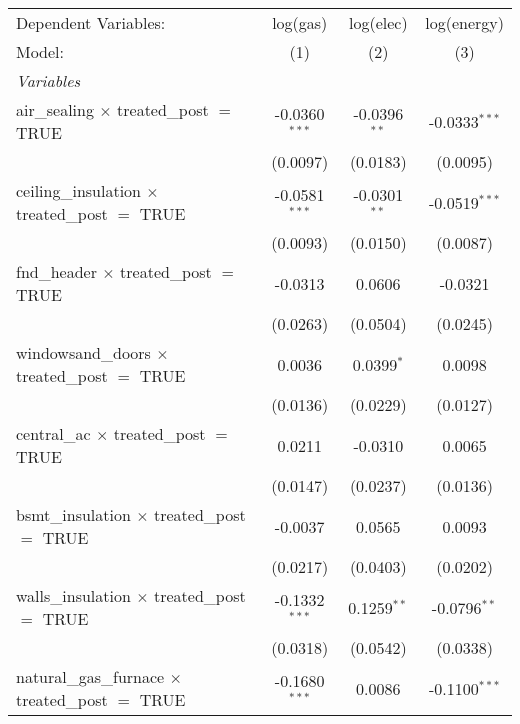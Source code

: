 \begin{tabular}{lccc}
   \tabularnewline\midrule\midrule
   Dependent Variables:                                      & log(gas)        & log(elec)      & log(energy)\\
   Model:                                                    & (1)             & (2)            & (3)\\
   \midrule \emph{Variables} &   &   &  \\
   air\_sealing $\times$ treated\_post $=$ TRUE           & -0.0360$^{***}$ & -0.0396$^{**}$ & -0.0333$^{***}$\\
                                                             & (0.0097)        & (0.0183)       & (0.0095)\\
   ceiling\_insulation $\times$ treated\_post $=$ TRUE    & -0.0581$^{***}$ & -0.0301$^{**}$ & -0.0519$^{***}$\\
                                                             & (0.0093)        & (0.0150)       & (0.0087)\\
   fnd\_header $\times$ treated\_post $=$ TRUE            & -0.0313         & 0.0606         & -0.0321\\
                                                             & (0.0263)        & (0.0504)       & (0.0245)\\
   windowsand\_doors $\times$ treated\_post $=$ TRUE      & 0.0036          & 0.0399$^{*}$   & 0.0098\\
                                                             & (0.0136)        & (0.0229)       & (0.0127)\\
   central\_ac $\times$ treated\_post $=$ TRUE            & 0.0211          & -0.0310        & 0.0065\\
                                                             & (0.0147)        & (0.0237)       & (0.0136)\\
   bsmt\_insulation $\times$ treated\_post $=$ TRUE       & -0.0037         & 0.0565         & 0.0093\\
                                                             & (0.0217)        & (0.0403)       & (0.0202)\\
   walls\_insulation $\times$ treated\_post $=$ TRUE      & -0.1332$^{***}$ & 0.1259$^{**}$  & -0.0796$^{**}$\\
                                                             & (0.0318)        & (0.0542)       & (0.0338)\\
   natural\_gas\_furnace $\times$ treated\_post $=$ TRUE & -0.1680$^{***}$ & 0.0086         & -0.1100$^{***}$\\

\end{tabular}
